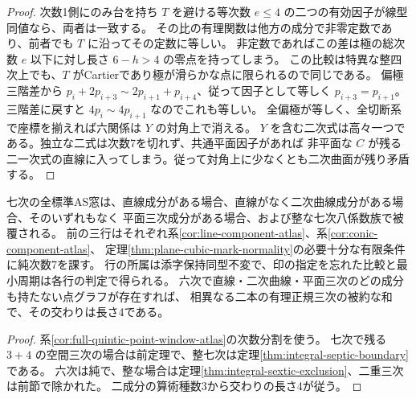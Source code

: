 \begin{proof}
次数1側にのみ台を持ち $T$ を避ける等次数 $e\le4$ の二つの有効因子が線型同値なら、両者は一致する。
その比の有理関数は他方の成分で非零定数であり、前者でも $T$ に沿ってその定数に等しい。
非定数であればこの差は極の総次数 $e$ 以下に対し長さ $6-h>4$ の零点を持ってしまう。
この比較は特異な整四次上でも、$T$ がCartierであり極が滑らかな点に限られるので同じである。
偏極三階差から $p_i+2p_{i+3}\sim2p_{i+1}+p_{i+4}$、従って因子として等しく
$p_{i+3}=p_{i+1}$。三階差に戻すと $4p_i\sim4p_{i+1}$ なのでこれも等しい。
全偏極が等しく、全切断系で座標を揃えれば六関係は $Y$ の対角上で消える。
$Y$ を含む二次式は高々一つである。独立な二式は次数7を切れず、共通平面因子があれば
非平面な $C$ が残る二一次式の直線に入ってしまう。従って対角上に少なくとも二次曲面が残り矛盾する。
\end{proof}

\begin{corollary}\label{cor:all-septic-point-windows}
七次の全標準AS窓は、直線成分がある場合、直線がなく二次曲線成分がある場合、そのいずれもなく
平面三次成分がある場合、および整な七次八係数族で被覆される。
前の三行はそれぞれ系\ref{cor:line-component-atlas}、系\ref{cor:conic-component-atlas}、
定理\ref{thm:plane-cubic-mark-normality}の必要十分な有限条件に純次数7を課す。
行の所属は添字保持同型不変で、印の指定を忘れた比較と最小周期は各行の判定で得られる。
六次で直線・二次曲線・平面三次のどの成分も持たない点グラフが存在すれば、
相異なる二本の有理正規三次の被約な和で、その交わりは長さ4である。
\end{corollary}
\begin{proof}
系\ref{cor:full-quintic-point-window-atlas}の次数分割を使う。
七次で残る $3+4$ の空間三次の場合は前定理で、整七次は定理\ref{thm:integral-septic-boundary}である。
六次は純で、整な場合は定理\ref{thm:integral-sextic-exclusion}、二重三次は前節で除かれた。
二成分の算術種数3から交わりの長さ4が従う。
\end{proof}
